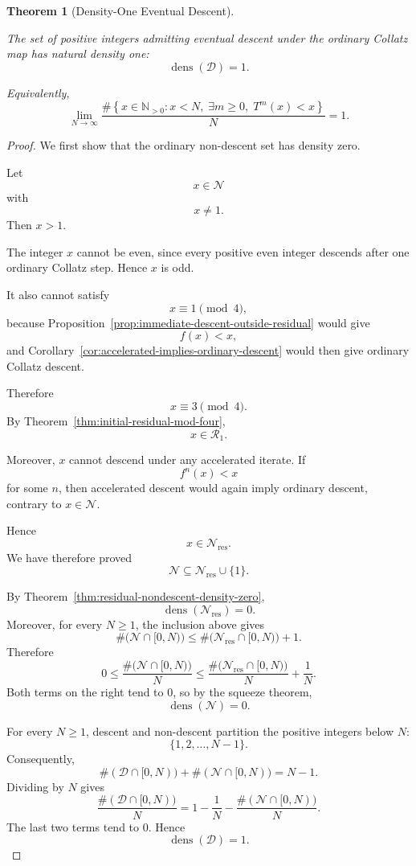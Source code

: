 \documentclass[12pt, oneside]{article}
\numberwithin{equation}{section}
\theoremstyle{definition}
\theoremstyle{plain}
\newtheorem{theorem}{Theorem}[section]
\theoremstyle{remark}
\begin{document}
\begin{theorem}[Density-One Eventual Descent]
\label{thm:density-one-eventual-descent}

The set of positive integers admitting eventual descent under the ordinary
Collatz map has natural density one:
\[
\boxed{
\operatorname{dens}(\mathcal D)=1.
}
\]

Equivalently,
\[
\boxed{
\lim_{N\to\infty}
\frac{
\#\left\{
x\in\mathbb N_{>0}:
x<N,\;
\exists m\ge0,\;
T^m(x)<x
\right\}
}{N}
=
1.
}
\]
\end{theorem}

\begin{proof}
We first show that the ordinary non-descent set has density zero.

Let
\[
x\in\mathcal N
\]
with
\[
x\ne1.
\]
Then \(x>1\).

The integer \(x\) cannot be even, since every positive even integer descends
after one ordinary Collatz step. Hence \(x\) is odd.

It also cannot satisfy
\[
x\equiv1\pmod4,
\]
because Proposition~\ref{prop:immediate-descent-outside-residual} would give
\[
f(x)<x,
\]
and Corollary~\ref{cor:accelerated-implies-ordinary-descent} would then give
ordinary Collatz descent.

Therefore
\[
x\equiv3\pmod4.
\]
By Theorem~\ref{thm:initial-residual-mod-four},
\[
x\in\mathcal R_1.
\]

Moreover, \(x\) cannot descend under any accelerated iterate. If
\[
f^n(x)<x
\]
for some \(n\), then accelerated descent would again imply ordinary descent,
contrary to \(x\in\mathcal N\).

Hence
\[
x\in\mathcal N_{\mathrm{res}}.
\]
We have therefore proved
\[
\boxed{
\mathcal N
\subseteq
\mathcal N_{\mathrm{res}}\cup\{1\}.
}
\]

By Theorem~\ref{thm:residual-nondescent-density-zero},
\[
\operatorname{dens}(\mathcal N_{\mathrm{res}})=0.
\]
Moreover, for every \(N\ge1\), the inclusion above gives
\[
\#\bigl(\mathcal N\cap[0,N)\bigr)
\le
\#\bigl(\mathcal N_{\mathrm{res}}\cap[0,N)\bigr)+1.
\]
Therefore
\[
0
\le
\frac{\#\bigl(\mathcal N\cap[0,N)\bigr)}{N}
\le
\frac{\#\bigl(\mathcal N_{\mathrm{res}}\cap[0,N)\bigr)}{N}
+\frac1N.
\]
Both terms on the right tend to \(0\), so by the squeeze theorem,
\[
\operatorname{dens}(\mathcal N)=0.
\]

For every \(N\ge1\), descent and non-descent partition the positive integers
below \(N\):
\[
\{1,2,\ldots,N-1\}.
\]
Consequently,
\[
\#(\mathcal D\cap[0,N))
+
\#(\mathcal N\cap[0,N))
=
N-1.
\]
Dividing by \(N\) gives
\[
\frac{\#(\mathcal D\cap[0,N))}{N}
=
1-\frac1N
-
\frac{\#(\mathcal N\cap[0,N))}{N}.
\]
The last two terms tend to \(0\). Hence
\[
\operatorname{dens}(\mathcal D)=1.
\]
\end{proof}
\end{document}
